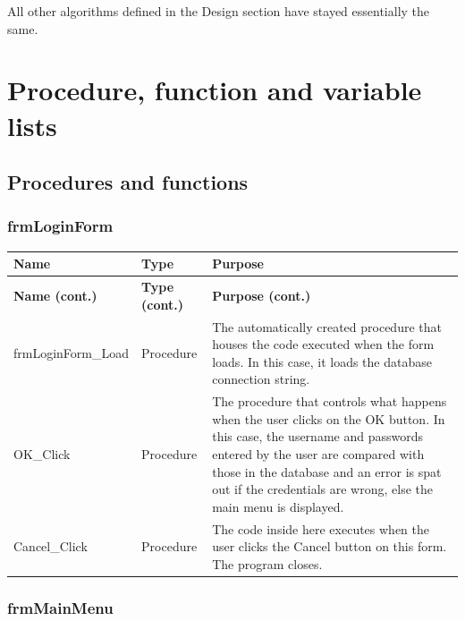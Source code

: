 	All other algorithms defined in the Design section have stayed essentially the same.
		
	\section{Procedure, function and variable lists}

	\subsection{Procedures and functions}
	
	\subsubsection{frmLoginForm}
	
	\begin{longtable}{ | p{4cm} | p{3cm} | p{10cm} | }
		\hline
		\textbf{Name} & \textbf{Type} & \textbf{Purpose}\\
		\endfirsthead
		\hline
		\textbf{Name (cont.)} & \textbf{Type (cont.)} & \textbf{Purpose (cont.)}\\
		\endhead
		\hline
		frmLoginForm\_Load & Procedure & The automatically created procedure that houses the code executed when the form loads.  In this case, it loads the database connection string.\\
		\hline
		OK\_Click & Procedure & The procedure that controls what happens when the user clicks on the OK button.  In this case, the username and passwords entered by the user are compared with those in the database and an error is spat out if the credentials are wrong, else the main menu is displayed.\\
		\hline
		Cancel\_Click & Procedure & The code inside here executes when the user clicks the Cancel button on this form.  The program closes.\\
		\hline
	\end{longtable}
	
	\subsubsection{frmMainMenu}
	
